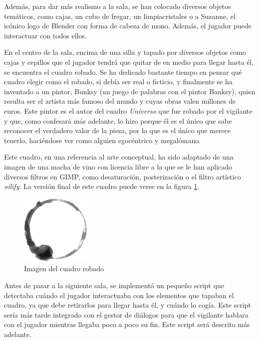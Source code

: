 Además, para dar más realismo a la sala, se han colocado diversos objetos temáticos, como cajas, un cubo de fregar, un limpiacristales o a Suzanne, el icónico logo de Blender con forma de cabeza de mono. Además, el jugador puede interactuar con todos ellos.

En el centro de la sala, encima de una silla y tapado por diversos objetos como cajas y cepillos que el jugador tendrá que quitar de en medio para llegar hasta él, se encuentra el cuadro robado. Se ha dedicado bastante tiempo en pensar qué cuadro elegir como el robado, si debía ser real o ficticio, y finalmente se ha inventado a un pintor, Bunksy (un juego de palabras con el pintor Banksy), quien resulta ser el artista más famoso del mundo y cuyas obras valen millones de euros. Este pintor es el autor del cuadro \textit{Universo} que fue robado por el vigilante y que, como confesará más adelante, lo hizo porque él es el único que sabe reconocer el verdadero valor de la pieza, por lo que es el único que merece tenerlo, haciéndose ver como alguien egocéntrico y megalómano.

Este cuadro, en una referencia al arte conceptual, ha sido adaptado de una imagen de una macha de vino con licencia libre a la que se le han aplicado diversos filtros en GIMP, como desaturación, posterización o el filtro artístico \textit{oilify}. La versión final de este cuadro puede verse en la figura \ref{fig:universe}.

\begin{figure}[!h]
\vspace{-0.15cm}
\begin{center}
\includegraphics[width=0.3\textwidth]{imagenes/7/wine-stain.jpg}
\caption{Imagen del cuadro robado}
\label{fig:universe}
\end{center}
\vspace{-0.35cm}
\end{figure}

Antes de pasar a la siguiente sala, se implementó un pequeño script que detectaba cuándo el jugador interactuaba con los elementos que tapaban el cuadro, ya que debe retirarlos para llegar hasta él, y cuándo lo cogía. Este script sería más tarde integrado con el gestor de diálogos para que el vigilante hablara con el jugador mientras llegaba poco a poco su fin. Este script será descrito más adelante.

